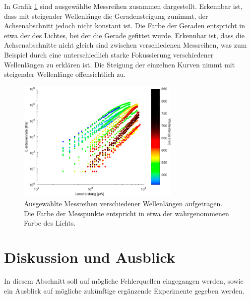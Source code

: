 \documentclass[bachelor,       %
               twoside,        %
               BCOR10mm,       %
               english,ngerman, %
               final,          %
               ]{GAUBM}
\begin{document}
\newpage
In Grafik \ref{fig:regenbogen} sind ausgewählte Messreihen zusammen dargestellt.
Erkennbar ist, dass mit steigender Wellenlänge die Geradensteigung zunimmt, der Achsenabschnitt jedoch nicht konstant ist.
Die Farbe der Geraden entspricht in etwa der des Lichtes, bei der die Gerade gefittet wurde.
Erkennbar ist, dass die Achsenabschnitte nicht gleich sind zwischen verschiedenen Messreihen, was zum Beispiel durch eine unterschiedlich starke Fokussierung verschiedener Wellenlängen zu erklären ist.
Die Steigung der einzelnen Kurven nimmt mit steigender Wellenlänge offensichtlich zu.


\begin{figure}[h!]
	\centering
	\includegraphics[width=0.7\textwidth]{Faecher_Daten}
	\caption{Ausgewählte Messreihen verschiedener Wellenlängen aufgetragen. Die Farbe der Messpunkte entspricht in etwa der wahrgenommenen Farbe des Lichts.}
	\label{fig:regenbogen}
\end{figure}






\chapter{Diskussion und Ausblick}
In diesem Abschnitt soll auf mögliche Fehlerquellen eingegangen werden, sowie ein Ausblick auf mögliche zukünftige ergänzende Experimente gegeben werden.
\end{document}
